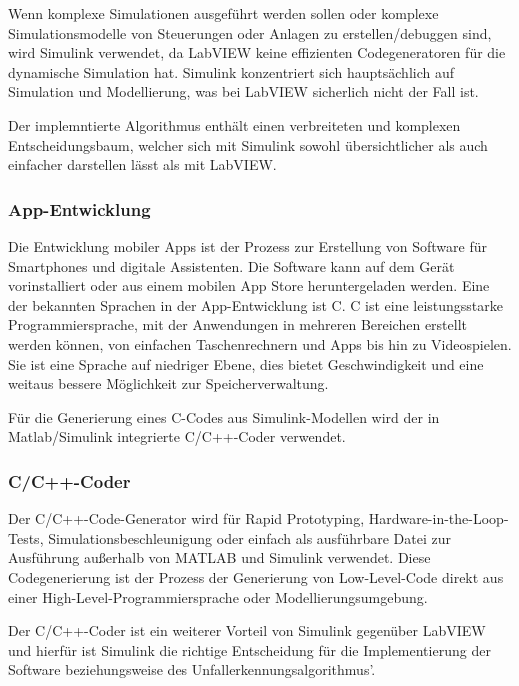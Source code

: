 
Wenn komplexe Simulationen ausgeführt werden sollen oder komplexe Simulationsmodelle von Steuerungen oder Anlagen zu erstellen/debuggen sind, wird Simulink verwendet, da LabVIEW keine effizienten Codegeneratoren für die dynamische Simulation hat.
Simulink konzentriert sich hauptsächlich auf Simulation und Modellierung, was bei LabVIEW sicherlich nicht der Fall ist.

Der implemntierte Algorithmus enthält einen verbreiteten und komplexen Entscheidungsbaum, welcher sich mit Simulink sowohl übersichtlicher als auch einfacher darstellen lässt als mit LabVIEW.



\subsubsection{App-Entwicklung}
Die Entwicklung mobiler Apps ist der Prozess zur Erstellung von Software für Smartphones und digitale Assistenten. Die Software kann auf dem Gerät vorinstalliert oder aus einem mobilen App Store heruntergeladen werden. Eine der bekannten Sprachen in der App-Entwicklung ist C.
C ist eine leistungsstarke Programmiersprache, mit der Anwendungen in mehreren Bereichen erstellt werden können, von einfachen Taschenrechnern und Apps bis hin zu Videospielen. Sie ist eine Sprache auf niedriger Ebene, dies bietet Geschwindigkeit und eine weitaus bessere Möglichkeit zur Speicherverwaltung.

Für die Generierung eines C-Codes aus Simulink-Modellen wird der in Matlab/Simulink integrierte C/C++-Coder verwendet.

\subsubsection{C/C++-Coder}
Der C/C++-Code-Generator wird für Rapid Prototyping, Hardware-in-the-Loop-Tests, Simulationsbeschleunigung oder einfach als ausführbare Datei zur Ausführung außerhalb von MATLAB und Simulink verwendet.
Diese Codegenerierung ist der Prozess der Generierung von Low-Level-Code direkt aus einer High-Level-Programmiersprache oder Modellierungsumgebung.

Der C/C++-Coder ist ein weiterer Vorteil von Simulink gegenüber LabVIEW und hierfür ist Simulink die richtige Entscheidung für die Implementierung der Software beziehungsweise des Unfallerkennungsalgorithmus'.






